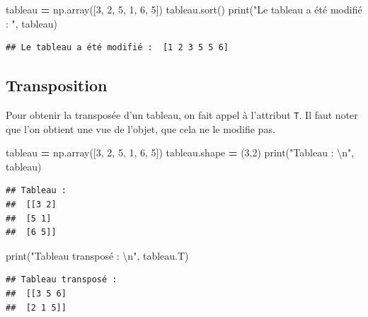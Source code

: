 \documentclass[12pt,]{book}
\newenvironment{Shaded}{\begin{snugshade}}{\end{snugshade}}
\newcommand{\DecValTok}[1]{\textcolor[rgb]{0.00,0.00,0.81}{#1}}
\newcommand{\CharTok}[1]{\textcolor[rgb]{0.31,0.60,0.02}{#1}}
\newcommand{\StringTok}[1]{\textcolor[rgb]{0.31,0.60,0.02}{#1}}
\newcommand{\OperatorTok}[1]{\textcolor[rgb]{0.81,0.36,0.00}{\textbf{#1}}}
\newcommand{\BuiltInTok}[1]{#1}
\newcommand{\NormalTok}[1]{#1}
\numberwithin{equation}{section}
\numberwithin{countremarque}{section}
\begin{document}
\begin{Shaded}
\begin{Highlighting}[]
\NormalTok{tableau }\OperatorTok{=}\NormalTok{ np.array([}\DecValTok{3}\NormalTok{, }\DecValTok{2}\NormalTok{, }\DecValTok{5}\NormalTok{, }\DecValTok{1}\NormalTok{, }\DecValTok{6}\NormalTok{, }\DecValTok{5}\NormalTok{])}
\NormalTok{tableau.sort()}
\BuiltInTok{print}\NormalTok{(}\StringTok{"Le tableau a été modifié : "}\NormalTok{, tableau)}
\end{Highlighting}
\end{Shaded}

\begin{lstlisting}
## Le tableau a été modifié :  [1 2 3 5 5 6]
\end{lstlisting}

\subsection{Transposition}\label{transposition-tableau}

Pour obtenir la transposée d'un tableau, on fait appel à l'attribut
\texttt{T}. Il faut noter que l'on obtient une vue de l'objet, que cela
ne le modifie pas.

\begin{Shaded}
\begin{Highlighting}[]
\NormalTok{tableau }\OperatorTok{=}\NormalTok{ np.array([}\DecValTok{3}\NormalTok{, }\DecValTok{2}\NormalTok{, }\DecValTok{5}\NormalTok{, }\DecValTok{1}\NormalTok{, }\DecValTok{6}\NormalTok{, }\DecValTok{5}\NormalTok{])}
\NormalTok{tableau.shape }\OperatorTok{=}\NormalTok{ (}\DecValTok{3}\NormalTok{,}\DecValTok{2}\NormalTok{)}
\BuiltInTok{print}\NormalTok{(}\StringTok{"Tableau : }\CharTok{\textbackslash{}n}\StringTok{"}\NormalTok{, tableau)}
\end{Highlighting}
\end{Shaded}

\begin{lstlisting}
## Tableau : 
##  [[3 2]
##  [5 1]
##  [6 5]]
\end{lstlisting}

\begin{Shaded}
\begin{Highlighting}[]
\BuiltInTok{print}\NormalTok{(}\StringTok{"Tableau transposé : }\CharTok{\textbackslash{}n}\StringTok{"}\NormalTok{, tableau.T)}
\end{Highlighting}
\end{Shaded}

\begin{lstlisting}
## Tableau transposé : 
##  [[3 5 6]
##  [2 1 5]]
\end{lstlisting}
\end{document}
